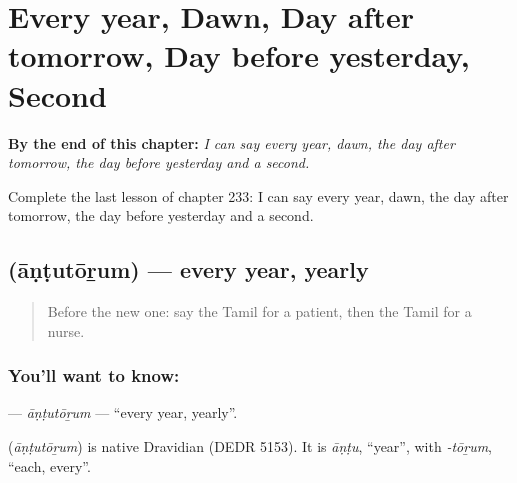 
\chapter{Every year, Dawn, Day after tomorrow, Day before yesterday, Second}
\label{ch:ta-every-year-dawn-day-after-tomorrow-day-before-yesterday-second}

\begin{chapteropening}
\textbf{By the end of this chapter:} \emph{I can say every year, dawn, the day after tomorrow, the day before yesterday and a second.}

Complete the last lesson of chapter 233: I can say every year, dawn, the day after tomorrow, the day before yesterday and a second.
\end{chapteropening}

\section[\texorpdfstring{\ta{ஆண்டுதோறும்} (āṇṭutōṟum)}{ஆண்டுதோறும் (āṇṭutōṟum)}]{ (āṇṭutōṟum) — every year, yearly}

\label{lesson:TA-C233-antutorum}



\begin{quote}
Before the new one: say the Tamil for a patient, then the Tamil for a nurse.
\end{quote}

\subsection*{You'll want to know: }
\textbf{} — \emph{āṇṭutōṟum} — \textquotedblleft{}every year, yearly\textquotedblright{}.

\begin{cousinweb}
\textbf{} (\emph{āṇṭutōṟum}) is native Dravidian (DEDR 5153). It is \emph{āṇṭu}, \textquotedblleft{}year\textquotedblright{}, with \emph{-tōṟum}, \textquotedblleft{}each, every\textquotedblright{}.
\end{cousinweb}

